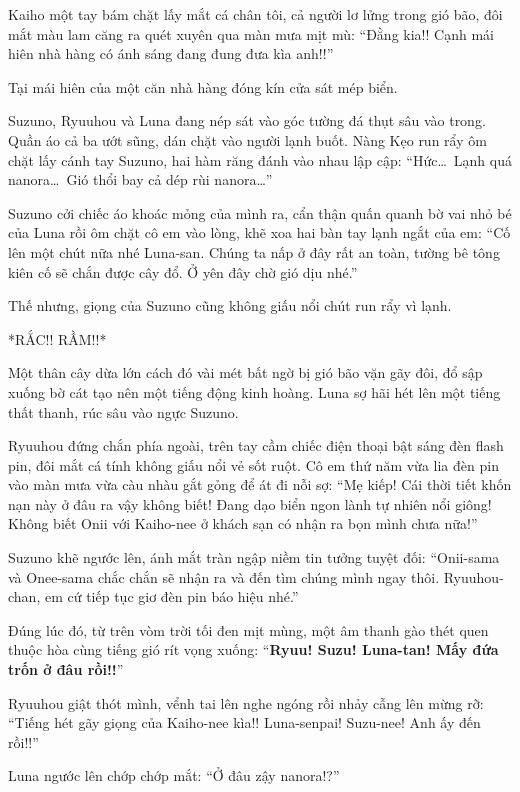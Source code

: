 \documentclass[../main.tex]{subfiles}
\begin{document}
Kaiho một tay bám chặt lấy mắt cá chân tôi, cả người lơ lửng trong gió bão, đôi mắt màu lam căng ra quét xuyên qua màn mưa mịt mù: ``Đằng kia!! Cạnh mái hiên nhà hàng có ánh sáng đang đung đưa kìa anh!!''

\ct

Tại mái hiên của một căn nhà hàng đóng kín cửa sát mép biển.

Suzuno, Ryuuhou và Luna đang nép sát vào góc tường đá thụt sâu vào trong. Quần áo cả ba ướt sũng, dán chặt vào người lạnh buốt. Nàng Kẹo run rẩy ôm chặt lấy cánh tay Suzuno, hai hàm răng đánh vào nhau lập cập: ``Hức\dots\ Lạnh quá nanora\dots\ Gió thổi bay cả dép rùi nanora\dots''

Suzuno cởi chiếc áo khoác mỏng của mình ra, cẩn thận quấn quanh bờ vai nhỏ bé của Luna rồi ôm chặt cô em vào lòng, khẽ xoa hai bàn tay lạnh ngắt của em: ``Cố lên một chút nữa nhé Luna-san. Chúng ta nấp ở đây rất an toàn, tường bê tông kiên cố sẽ chắn được cây đổ. Ở yên đây chờ gió dịu nhé.''

Thế nhưng, giọng của Suzuno cũng không giấu nổi chút run rẩy vì lạnh.

*RẮC!! RẦM!!*

Một thân cây dừa lớn cách đó vài mét bất ngờ bị gió bão vặn gãy đôi, đổ sập xuống bờ cát tạo nên một tiếng động kinh hoàng. Luna sợ hãi hét lên một tiếng thất thanh, rúc sâu vào ngực Suzuno.

Ryuuhou đứng chắn phía ngoài, trên tay cầm chiếc điện thoại bật sáng đèn flash pin, đôi mắt cá tính không giấu nổi vẻ sốt ruột. Cô em thứ năm vừa lia đèn pin vào màn mưa vừa càu nhàu gắt gỏng để át đi nỗi sợ: ``Mẹ kiếp! Cái thời tiết khốn nạn này ở đâu ra vậy không biết! Đang dạo biển ngon lành tự nhiên nổi giông! Không biết Onii với Kaiho-nee ở khách sạn có nhận ra bọn mình chưa nữa!''

Suzuno khẽ ngước lên, ánh mắt tràn ngập niềm tin tưởng tuyệt đối: ``Onii-sama và Onee-sama chắc chắn sẽ nhận ra và đến tìm chúng mình ngay thôi. Ryuuhou-chan, em cứ tiếp tục giơ đèn pin báo hiệu nhé.''

Đúng lúc đó, từ trên vòm trời tối đen mịt mùng, một âm thanh gào thét quen thuộc hòa cùng tiếng gió rít vọng xuống: ``\textbf{Ryuu! Suzu! Luna-tan! Mấy đứa trốn ở đâu rồi!!}''

Ryuuhou giật thót mình, vểnh tai lên nghe ngóng rồi nhảy cẫng lên mừng rỡ: ``Tiếng hét gãy giọng của Kaiho-nee kìa!! Luna-senpai! Suzu-nee! Anh ấy đến rồi!!''

Luna ngước lên chớp chớp mắt: ``Ở đâu zậy nanora!?''
\end{document}
